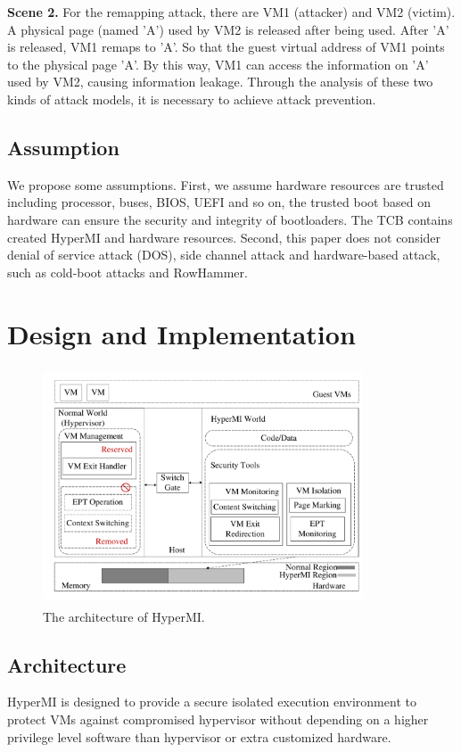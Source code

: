 \documentclass[conference]{IEEEtran}
\begin{document}
\textbf{Scene 2.}
    For the remapping attack, there are VM1 (attacker) and VM2 (victim). A physical page (named 'A') used by VM2 is released after being used. After 'A' is released, VM1 remaps to 'A'. So that the guest virtual address of VM1 points to the physical page 'A'. By this way, VM1 can access the information on 'A' used by VM2, causing information leakage.
Through the analysis of these two kinds of attack models, it is necessary to achieve attack prevention.
\subsection{Assumption}

We propose some assumptions.
First, we assume hardware resources are trusted including processor, buses, BIOS, UEFI and so on, the trusted boot based on hardware can ensure the security and integrity of bootloaders. The TCB contains created HyperMI and hardware resources. Second, this paper does not consider denial of service attack (DOS), side channel attack and hardware-based attack, such as cold-boot attacks and RowHammer.


\section{Design and Implementation}\label{sec:design}



\begin{figure}
\centerline{\includegraphics[width=9.5cm, height=7cm]{pdfvmcs1.pdf}}%
\caption{The architecture of HyperMI. } \label{fig1}
\end{figure}

\subsection{Architecture} 
HyperMI is designed to provide a secure isolated execution environment to protect VMs against compromised hypervisor without depending on a higher privilege level software than hypervisor or extra customized hardware.
\end{document}
